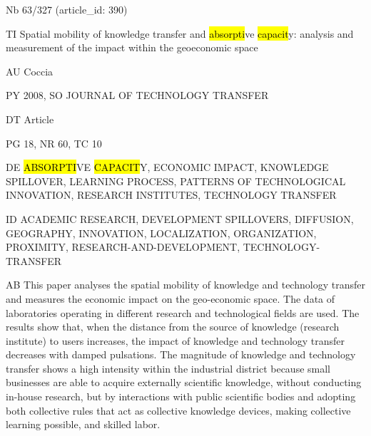 \documentclass[a4paper]{article}
\begin{document}
\vspace*{-2cm}
Nb \tabto{0cm}63/327 (article\_id: 390)\par
TI \tabto{0cm}Spatial mobility of knowledge transfer and \hl{absorpti}ve \hl{capacit}y: analysis and measurement of the impact within the geoeconomic space\par
AU \tabto{0cm}Coccia\par
PY \tabto{0cm}2008, SO JOURNAL OF TECHNOLOGY TRANSFER\par
DT \tabto{0cm}Article\par
PG \tabto{0cm}18, NR 60, TC 10\par
DE \tabto{0cm}\hl{ABSORPTI}VE \hl{CAPACIT}Y, ECONOMIC IMPACT, KNOWLEDGE SPILLOVER, LEARNING PROCESS, PATTERNS OF TECHNOLOGICAL INNOVATION, RESEARCH INSTITUTES, TECHNOLOGY TRANSFER\par
ID \tabto{0cm}ACADEMIC RESEARCH, DEVELOPMENT SPILLOVERS, DIFFUSION, GEOGRAPHY, INNOVATION, LOCALIZATION, ORGANIZATION, PROXIMITY, RESEARCH-AND-DEVELOPMENT, TECHNOLOGY-TRANSFER\par
AB \tabto{0cm}This paper analyses the spatial mobility of knowledge and technology transfer and measures the economic impact on the geo-economic space. The data of laboratories operating in different research and technological fields are used. The results show that, when the distance from the source of knowledge (research institute) to users increases, the impact of knowledge and technology transfer decreases with damped pulsations. The magnitude of knowledge and technology transfer shows a high intensity within the industrial district because small businesses are able to acquire externally scientific knowledge, without conducting in-house research, but by interactions with public scientific bodies and adopting both collective rules that act as collective knowledge devices, making collective learning possible, and skilled labor.\par
\clearpage
\end{document}
